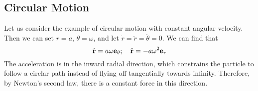 \subsection{Circular Motion}
Let us consider the example of circular motion with constant angular velocity.
Then we can set \(r = a\), \(\dot\theta = \omega\), and let \(\dot r = \ddot r = \ddot \theta = 0\).
We can find that
\[
	\dot {\vb r} = a \omega \vb e_\theta ;\quad \ddot{\vb r} = -a\omega^2 \vb e_r
\]
The acceleration is in the inward radial direction, which constrains the particle to follow a circlar path instead of flying off tangentially towards infinity.
Therefore, by Newton's second law, there is a constant force in this direction.
